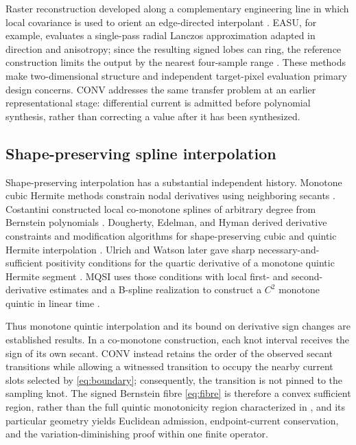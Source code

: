 \documentclass[journal]{IEEEtran}
\begin{document}
Raster reconstruction developed along a complementary engineering line in
which local covariance is used to orient an edge-directed interpolant
\cite{li2001}. EASU, for example, evaluates a single-pass radial Lanczos
approximation adapted in direction and anisotropy; since the resulting signed
lobes can ring, the reference construction limits the output by the nearest
four-sample range \cite{lottes2021}. These methods make two-dimensional
structure and independent target-pixel evaluation primary design concerns.
CONV addresses the same transfer problem at an earlier representational
stage: differential current is admitted before polynomial synthesis, rather
than correcting a value after it has been synthesized.

\subsection{Shape-preserving spline interpolation}

Shape-preserving interpolation has a substantial independent history.
Monotone cubic Hermite methods constrain nodal derivatives using neighboring
secants \cite{fritsch1980,hyman1983}. Costantini constructed local
co-monotone splines of arbitrary degree from Bernstein polynomials
\cite{costantini1987}. Dougherty, Edelman, and Hyman derived derivative
constraints and modification algorithms for shape-preserving cubic and
quintic Hermite interpolation \cite{dougherty1989}. Ulrich and Watson later
gave sharp necessary-and-sufficient positivity conditions for the quartic
derivative of a monotone quintic Hermite segment \cite{ulrich1994}. MQSI uses
those conditions with local first- and second-derivative estimates and a
B-spline realization to construct a \(C^2\) monotone quintic in linear time
\cite{lux2023}.

Thus monotone quintic interpolation and its bound on derivative sign changes
are established results. In a co-monotone construction, each knot interval
receives the sign of its own secant. CONV instead retains the order of the
observed secant transitions while allowing a witnessed transition to occupy
the nearby current slots selected by \eqref{eq:boundary}; consequently, the
transition is not pinned to the sampling knot. The signed Bernstein fibre
\eqref{eq:fibre} is therefore a convex sufficient region, rather than the full
quintic monotonicity region characterized in \cite{ulrich1994}, and its
particular geometry yields Euclidean admission, endpoint-current
conservation, and the variation-diminishing proof within one finite operator.
\end{document}
